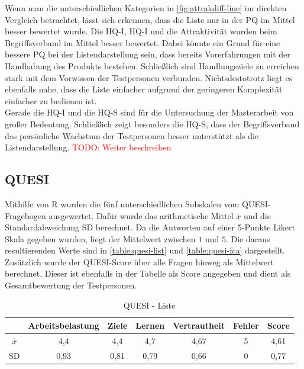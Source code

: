 Wenn man die unterschiedlichen Kategorien in \autoref{fig:attrakdiff-line} im direkten Vergleich betrachtet, lässt sich erkennen, dass die Liste nur in der \ac{PQ} im Mittel besser bewertet wurde.
Die \ac{HQ-I}, \ac{HQ-I} und die Attraktivität wurden beim Begriffsverband im Mittel besser bewertet.
Dabei könnte ein Grund für eine bessere \ac{PQ} bei der Listendarstellung sein, dass bereits Vorerfahrungen mit der Handhabung des Produkts bestehen.
Schließlich sind Handlungsziele zu erreichen stark mit dem Vorwissen der Testpersonen verbunden.
Nichtsdestotrotz liegt es ebenfalls nahe, dass die Liste einfacher aufgrund der geringeren Komplexität einfacher zu bedienen ist.\\

Gerade die \ac{HQ-I} und die \ac{HQ-S} sind für die Untersuchung der Masterarbeit von großer Bedeutung.
Schließlich zeigt besonders die \ac{HQ-S}, dass der Begriffsverband das persönliche Wachstum der Testpersonen besser unterstützt als die Listendarstellung.
\textcolor{red}{TODO: Weiter beschreiben}

\subsection{QUESI}
Mithilfe von R wurden die fünf unterschiedlichen Subskalen vom \ac{QUESI}-Fragebogen ausgewertet.
Dafür wurde das arithmetische Mittel $\overline{x}$ und die Standardabweichung SD berechnet.
Da die Antworten auf einer 5-Punkte Likert Skala gegeben wurden, liegt der Mittelwert zwischen $1$ und $5$.
Die daraus resultierenden Werte sind in \autoref{table:quesi-list} und \autoref{table:quesi-fca} dargestellt.
Zusätzlich wurde der \ac{QUESI}-Score über alle Fragen hinweg als Mittelwert berechnet.
Dieser ist ebenfalls in der Tabelle als Score angegeben und dient als Gesamtbewertung der Testpersonen.

\begin{center}
    \begin{table}[!ht]
        \centering
        \begin{tabular}{|l|c|c|c|c|c|c|}
            \hline
                                                 & Arbeitsbelastung & Ziele & Lernen & Vertrautheit & Fehler & Score \\ \hline \hline
            \multicolumn{1}{|c|}{$\overline{x}$} & 4,4              & 4,4   & 4,7    & 4,67         & 5      & 4,61  \\ \hline
            \multicolumn{1}{|c|}{SD}             & 0,93             & 0,81  & 0,79   & 0,66         & 0      & 0,77  \\ \hline
        \end{tabular}
        \caption{QUESI - Liste}
        \label{table:quesi-list}
    \end{table}
\end{center}

